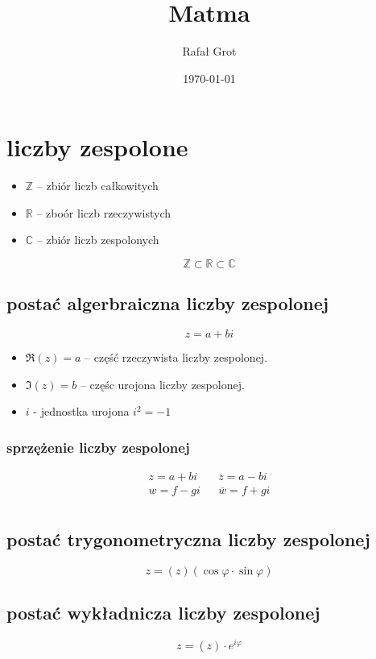 \documentclass[11pt]{article}
\author{Rafał Grot}
\date{\today}
\title{Matma}
\begin{document}
\maketitle
\tableofcontents


\section{liczby zespolone}
\label{sec:org350dedd}
\begin{itemize}
\item \(\mathbb{Z}\) -- zbiór liczb całkowitych
\item \(\mathbb{R}\) -- zboór liczb rzeczywistych
\item \(\mathbb{C}\) -- zbiór liczb zespolonych
\end{itemize}
$$\mathbb{Z} \subset \mathbb{R} \subset \mathbb{C}$$
\subsection{postać algerbraiczna liczby zespolonej}
\label{sec:orgd3779e2}
$$z=a+bi$$

\begin{itemize}
\item \(\Re(z) = a\) -- część rzeczywista liczby zespolonej.
\item \(\Im(z) = b\) -- częśc urojona liczby zespolonej.
\item \(i\) - jednostka urojona \(i^2=-1\)
\end{itemize}
\subsubsection{sprzężenie liczby zespolonej}
\label{sec:org6ffaeb3}
\begin{latex}
\begin{align*}
  z=a+bi && \overline{z}=a-bi \\
  w=f-gi && \overline{w}=f+gi \\
\end{align*}
\end{latex}

\subsection{postać trygonometryczna liczby zespolonej}
\label{sec:orga73d6aa}
$$z=(z)(\cos\varphi \cdot \sin\varphi)$$
\subsection{postać wykładnicza liczby zespolonej}
\label{sec:org1984880}
$$z=(z) \cdot e^{i\varphi}$$
\end{document}

